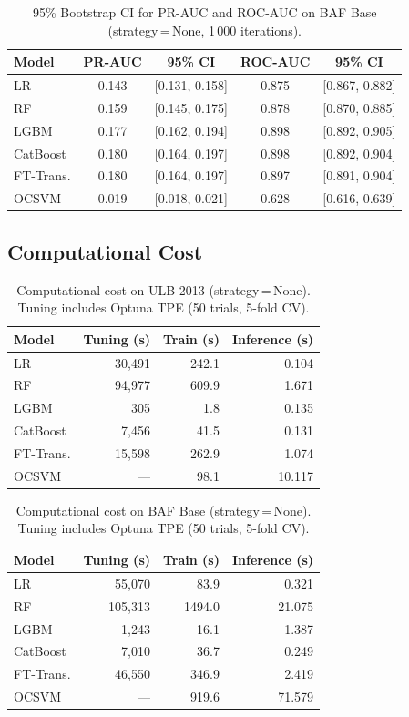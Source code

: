 \begin{table}[ht!]
\centering
\caption{95\% Bootstrap CI for PR-AUC and ROC-AUC on BAF Base (strategy\,=\,None, 1\,000 iterations).}
\label{tab:ci_baf}
\begin{tabular}{l c c c c}
\toprule
Model & PR-AUC & 95\% CI & ROC-AUC & 95\% CI \\
\midrule
LR         & 0.143 & [0.131, 0.158] & 0.875 & [0.867, 0.882] \\
RF         & 0.159 & [0.145, 0.175] & 0.878 & [0.870, 0.885] \\
LGBM       & 0.177 & [0.162, 0.194] & 0.898 & [0.892, 0.905] \\
CatBoost   & 0.180 & [0.164, 0.197] & 0.898 & [0.892, 0.904] \\
FT-Trans.  & 0.180 & [0.164, 0.197] & 0.897 & [0.891, 0.904] \\
OCSVM      & 0.019 & [0.018, 0.021] & 0.628 & [0.616, 0.639] \\
\bottomrule
\end{tabular}
\end{table}

\subsection{Computational Cost}

\begin{table}[ht!]
\centering
\caption{Computational cost on ULB 2013 (strategy\,=\,None). Tuning includes Optuna TPE (50 trials, 5-fold CV).}
\label{tab:cost_ulb}
\begin{tabular}{l r r r}
\toprule
Model & Tuning (s) & Train (s) & Inference (s) \\
\midrule
LR         & 30,491 & 242.1 & 0.104 \\
RF         & 94,977 & 609.9 & 1.671 \\
LGBM       & 305 & 1.8 & 0.135 \\
CatBoost   & 7,456 & 41.5 & 0.131 \\
FT-Trans.  & 15,598 & 262.9 & 1.074 \\
OCSVM      & --- & 98.1 & 10.117 \\
\bottomrule
\end{tabular}
\end{table}

\begin{table}[ht!]
\centering
\caption{Computational cost on BAF Base (strategy\,=\,None). Tuning includes Optuna TPE (50 trials, 5-fold CV).}
\label{tab:cost_baf}
\begin{tabular}{l r r r}
\toprule
Model & Tuning (s) & Train (s) & Inference (s) \\
\midrule
LR         & 55,070 & 83.9 & 0.321 \\
RF         & 105,313 & 1494.0 & 21.075 \\
LGBM       & 1,243 & 16.1 & 1.387 \\
CatBoost   & 7,010 & 36.7 & 0.249 \\
FT-Trans.  & 46,550 & 346.9 & 2.419 \\
OCSVM      & --- & 919.6 & 71.579 \\
\bottomrule
\end{tabular}
\end{table}


